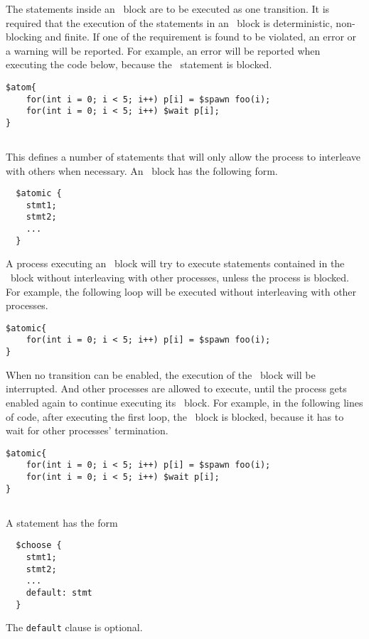 \documentclass[11pt, oneside, letterpaper]{book}
\begin{document}
The statements inside an \catom~block are to be executed as one transition. It is required that the execution of the statements in an \catom~block is deterministic, non-blocking and finite. If one of the requirement is found to be violated, an error or a warning will be reported. For example, an error will be reported  when executing the code below, because the \cwait~statement is blocked.

\begin{verbatim}  
$atom{
    for(int i = 0; i < 5; i++) p[i] = $spawn foo(i);
    for(int i = 0; i < 5; i++) $wait p[i];
}
\end{verbatim}


\subsection{\catomic} This defines a number of statements that will only allow the process to interleave with others when necessary. An \catomic~block has the following form.

\begin{verbatim}
  $atomic {
    stmt1;
    stmt2;
    ...
  }
\end{verbatim}

A process executing an \catomic~block will try to execute statements contained in the \catomic~block without interleaving with other processes, unless the process is blocked. For example, the following loop will be executed without interleaving with other processes.

\begin{verbatim}
$atomic{
    for(int i = 0; i < 5; i++) p[i] = $spawn foo(i);
}
\end{verbatim}

When no transition can be enabled, the execution of the \catomic~block will be interrupted. And other processes are allowed to execute, until the process gets enabled again to continue executing its \catomic~block. For example, in the following lines of code, after executing the first loop, the \catomic~block is blocked, because it has to wait for other processes' termination.
 
\begin{verbatim}  
$atomic{
    for(int i = 0; i < 5; i++) p[i] = $spawn foo(i);
    for(int i = 0; i < 5; i++) $wait p[i];
}
\end{verbatim}

\subsection{\cchoose}  A \cchoose{} statement has the form
\begin{verbatim}
  $choose {
    stmt1;
    stmt2;
    ...
    default: stmt
  }
\end{verbatim}
The \texttt{default} clause is optional.
\end{document}
